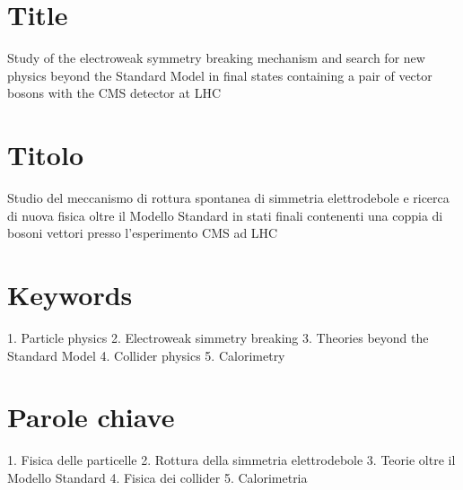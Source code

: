 \documentclass[10pt, a4paper]{article}
\begin{document}
\reversemarginpar

\section*{Title}
Study of the electroweak symmetry breaking mechanism and search 
for new physics beyond the Standard Model in final states containing a pair of 
vector bosons with the CMS detector at LHC

\section*{Titolo}
Studio del meccanismo di rottura spontanea di simmetria elettrodebole e
ricerca di nuova fisica oltre il Modello Standard in stati finali contenenti una coppia
di bosoni vettori presso l'esperimento CMS ad LHC

\section*{Keywords}
1. Particle physics
2. Electroweak simmetry breaking
3. Theories beyond the Standard Model
4. Collider physics
5. Calorimetry

\section*{Parole chiave}
1. Fisica delle particelle
2. Rottura della simmetria elettrodebole
3. Teorie oltre il Modello Standard
4. Fisica dei collider
5. Calorimetria
\end{document}

